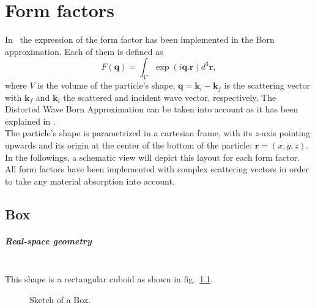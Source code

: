 \chapter{Form factors} \label{appendixff}
In \BornAgain\ the expression of the form factor has been implemented in the Born approximation. Each of them is defined as
\begin{equation*}
F(\mathbf{q})=\int_V \exp (i\mathbf{q}.\mathbf{r}) d^3 \mathbf{r},
\end{equation*}
where $V$ is the volume of the particle's shape,
$\mathbf{q}=\mathbf{k}_i - \mathbf{k}_f$ is the scattering vector with
$\mathbf{k}_f$ and $\mathbf{k}_i$ the scattered and incident wave
vector, respectively. The Distorted Wave Born Approximation can be taken into account as it has been explained in .\\

The particle's shape is parametrized in a cartesian frame, with its
$z$-axis pointing upwards and its origin at the center of the bottom
of the particle: $\mathbf{r}=(x,y,z)$. In the followings, a schematic view will depict this layout for each
form factor.\\


All form factors have been implemented with complex scattering vectors
in order to take any material absorption into account.\\

\newpage%
\section{Box}  

\paragraph{Real-space geometry}\mbox{}\\
This shape is a rectangular cuboid as
shown in fig.~\ref{fig:box}. 

\begin{figure}[ht]
\hfill
{}
\hfill
{}
\hfill
\caption{Sketch of a Box.}
\label{fig:box}
\end{figure}

